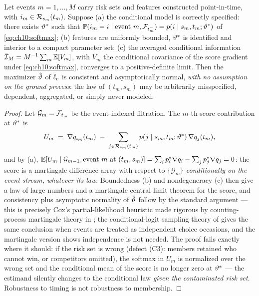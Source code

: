 \begin{proposition}\label{prop:ch10:consistency}
Let events $m = 1, \dots, M$ carry risk sets and features constructed
point-in-time, with $i_m \in \mathcal{R}_{s_m}(t_m)$. Suppose (a) the
conditional model is correctly specified: there exists $\vartheta^*$
such that $\mathbb{P}(i_m = i \mid \text{event } m, \mathcal{F}_{t_m^-}) = p(i \mid s_m,
t_m; \vartheta^*)$ of \cref{eq:ch10:softmax}; (b) features are
uniformly bounded, $\vartheta^*$ is identified and interior to a
compact parameter set; (c) the averaged conditional information
$\bar{\mathcal{I}}_M = M^{-1}\sum_m \mathbb{E}[V_m]$, with $V_m$ the conditional
covariance of the score gradient under \cref{eq:ch10:softmax}, converges
to a positive-definite limit. Then the maximizer $\hat{\vartheta}$ of
$\ell_{\mathrm c}$ is consistent and asymptotically normal,
\emph{with no assumption on the ground process}: the law of $(t_m, s_m)$
may be arbitrarily misspecified, dependent, aggregated, or simply never
modeled.
\end{proposition}

\begin{proof}
Let $\mathcal{G}_m = \mathcal{F}_{t_m}$ be the event-indexed filtration. The
$m$-th score contribution at $\vartheta^*$ is
\[
U_m \;=\; \nabla q_{i_m}(t_m)
 \;-\; \sum_{j \in \mathcal{R}_{s_m}(t_m)} p(j \mid s_m, t_m;\vartheta^*)
 \, \nabla q_j(t_m),
\]
and by (a), $\mathbb{E}[U_m \mid \mathcal{G}_{m-1}, \text{event } m \text{ at }
(t_m, s_m)] = \sum_i p^*_i \nabla q_i - \sum_j p^*_j \nabla q_j
= 0$: the score is a martingale difference array with respect to
$\{\mathcal{G}_m\}$ \emph{conditionally on the event stream, whatever its
law}. Boundedness (b) and nondegeneracy (c) then give a law of large
numbers and a martingale central limit theorem for the score, and
consistency plus asymptotic normality of $\hat{\vartheta}$ follow by the
standard argument --- this is precisely Cox's partial-likelihood
heuristic \citep{cox1975} made rigorous by counting-process martingale
theory in \citet{andersengill1982}; the conditional-logit sampling theory
of \citet{mcfadden1974} gives the same conclusion when events are treated
as independent choice occasions, and the martingale version shows
independence is not needed. The proof fails exactly where it should: if
the risk set is wrong (defect (C3): members retained who cannot win, or
competitors omitted), the softmax in $U_m$ is normalized over the wrong
set and the conditional mean of the score is no longer zero at
$\vartheta^*$ --- the estimand silently changes to the conditional law
\emph{given the contaminated risk set}. Robustness to timing is not
robustness to membership.
\end{proof}

